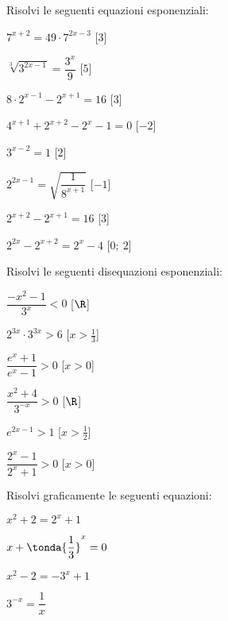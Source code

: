 \begin{esercizio}\label{ese:}
 Risolvi le seguenti equazioni esponenziali:
 \begin{multicols}{2}
 \begin{enumeratea}
   \item \(7^{x+2}=49 \cdot 7^{2x-3}\) \hfill[\(3\)]
   \item \(\sqrt[3]{3^{2x-1}}=\dfrac{3^x}{9}\) \hfill[\(5\)]
   \item \(8 \cdot 2^{x-1}-2^{x+1}=16\) \hfill[\(3\)]
   \item \(4^{x + 1} +2^{x + 2} -2^x -1 =0\) \hfill[\(-2\)]
   \item \(3^{x - 2} =1\) \hfill[\(2\)]
   \item \(2^{2 x - 1} = \sqrt { \dfrac{1}{8^{x + 1}}}\) \hfill[\(-1\)]
   \item \(2^{x + 2} -2^{x + 1} =16\) \hfill[\(3\)]
   \item \(2^{2 x} -2^{x + 2} =2^x -4\) \hfill[\(0;~2\)]
 \end{enumeratea}
 \end{multicols}
\end{esercizio}

\begin{esercizio}\label{ese:}
 Risolvi le seguenti disequazioni esponenziali:
 \begin{multicols}{2}
 \begin{enumeratea}
   \item \(\dfrac{{-x}^2 - 1}{3^x} < 0\) \hfill[\(\R\)]
   \item \(2^{3 x} \cdot 3^{3 x} > 6\) \hfill[\(x > \frac{1}{3}\)]
   \item \(\dfrac{e^x + 1}{e^x - 1} > 0\) \hfill[\(x > 0\)]
   \item \(\dfrac{x^2 + 4}{3^{-x}} > 0\) \hfill[\(\R\)]
   \item \(e^{2 x - 1} > 1\) \hfill[\(x > \frac{1}{2}\)]
   \item \(\dfrac{2^x - 1}{2^x + 1} > 0\) \hfill[\(x > 0\)]
 \end{enumeratea}
 \end{multicols}
\end{esercizio}

\begin{esercizio}\label{ese:}
 Risolvi graficamente le seguenti equazioni:
 \begin{multicols}{2}
 \begin{enumeratea}
   \item \(x^2 +2 =2^x +1\)
   \item \(x + \tonda{\dfrac{1}{3}}^x = 0\)
   \item \(x^2 -2 = -3^x +1\)
   \item \(3^{-x} = \dfrac{1}{x}\)
 \end{enumeratea}
 \end{multicols}
\end{esercizio}


